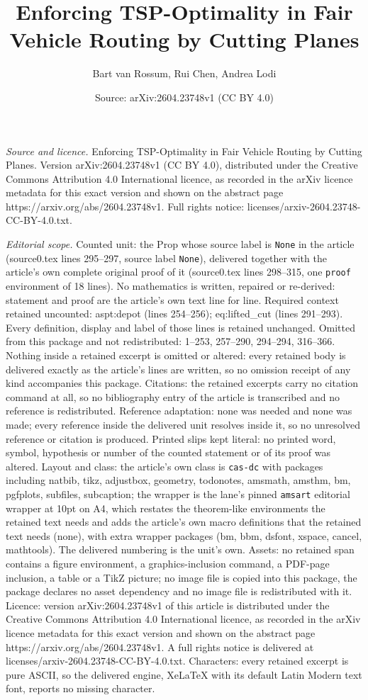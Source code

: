 \documentclass[10pt,a4paper]{amsart}
\title[Enforcing TSP-Optimality in Fair Vehicle Routing by Cutting ]{Enforcing TSP-Optimality in Fair Vehicle Routing by Cutting Planes}
\author{Bart van Rossum, Rui Chen, Andrea Lodi}
\date{Source: arXiv:2604.23748v1 (CC BY 4.0)}
\begin{document}
\maketitle

\noindent\emph{Source and licence.} Enforcing TSP-Optimality in Fair Vehicle Routing by Cutting Planes. Version arXiv:2604.23748v1 (CC BY 4.0), distributed under the Creative Commons Attribution 4.0 International licence, as recorded in the arXiv licence metadata for this exact version and shown on the abstract page https://arxiv.org/abs/2604.23748v1. Full rights notice: licenses/arxiv-2604.23748-CC-BY-4.0.txt.\par\smallskip

\noindent\textit{Editorial scope.} Counted unit: the Prop whose source label is \texttt{None} in the article (source0.tex lines 295--297, source label \texttt{None}), delivered together with the article's own complete original proof of it (source0.tex lines 298--315, one \texttt{proof} environment of 18 lines). No mathematics is written, repaired or re-derived: statement and proof are the article's own text line for line. Required context retained uncounted: aspt:depot (lines 254--256); eq:lifted\_cut (lines 291--293). Every definition, display and label of those lines is retained unchanged. Omitted from this package and not redistributed: 1--253, 257--290, 294--294, 316--366. Nothing inside a retained excerpt is omitted or altered: every retained body is delivered exactly as the article's lines are written, so no omission receipt of any kind accompanies this package. Citations: the retained excerpts carry no citation command at all, so no bibliography entry of the article is transcribed and no reference is redistributed. Reference adaptation: none was needed and none was made; every reference inside the delivered unit resolves inside it, so no unresolved reference or citation is produced. Printed slips kept literal: no printed word, symbol, hypothesis or number of the counted statement or of its proof was altered. Layout and class: the article's own class is \texttt{cas-dc} with packages including natbib, tikz, adjustbox, geometry, todonotes, amsmath, amsthm, bm, pgfplots, subfiles, subcaption; the wrapper is the lane's pinned \texttt{amsart} editorial wrapper at 10pt on A4, which restates the theorem-like environments the retained text needs and adds the article's own macro definitions that the retained text needs (none), with extra wrapper packages (bm, bbm, dsfont, xspace, cancel, mathtools). The delivered numbering is the unit's own. Assets: no retained span contains a figure environment, a graphics-inclusion command, a PDF-page inclusion, a table or a TikZ picture; no image file is copied into this package, the package declares no asset dependency and no image file is redistributed with it. Licence: version arXiv:2604.23748v1 of this article is distributed under the Creative Commons Attribution 4.0 International licence, as recorded in the arXiv licence metadata for this exact version and shown on the abstract page https://arxiv.org/abs/2604.23748v1. A full rights notice is delivered at licenses/arxiv-2604.23748-CC-BY-4.0.txt. Characters: every retained excerpt is pure ASCII, so the delivered engine, XeLaTeX with its default Latin Modern text font, reports no missing character.
\end{document}
